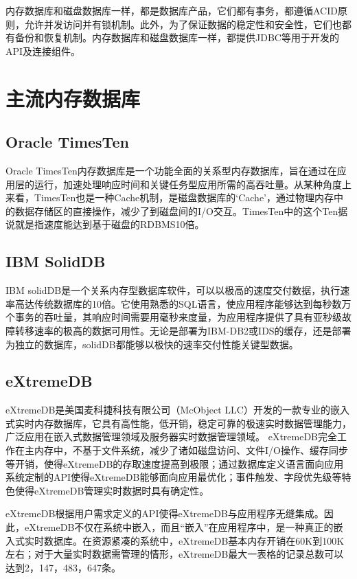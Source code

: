 \documentclass[literaturereview]{zjutreport}
\begin{document}
内存数据库和磁盘数据库一样，都是数据库产品，它们都有事务，都遵循ACID原则，允许并发访问并有锁机制。此外，为了保证数据的稳定性和安全性，它们也都有备份和恢复机制\cite{ref:6}。内存数据库和磁盘数据库一样，都提供JDBC等用于开发的API及连接组件。

\chapter{主流内存数据库}
\section{Oracle TimesTen}
Oracle TimesTen\cite{ref:7}内存数据库是一个功能全面的关系型内存数据库，旨在通过在应用层的运行，加速处理响应时间和关键任务型应用所需的高吞吐量。从某种角度上来看，TimesTen也是一种Cache机制，是磁盘数据库的‘Cache’，通过物理内存中的数据存储区的直接操作，减少了到磁盘间的I/O交互。TimesTen中的这个Ten据说就是指速度能达到基于磁盘的RDBMS10倍。

\section{IBM SolidDB}
IBM solidDB\cite{ref:8}是一个关系内存型数据库软件，可以以极高的速度交付数据，执行速率高达传统数据库的10倍。它使用熟悉的SQL语言，使应用程序能够达到每秒数万个事务的吞吐量，其响应时间需要用毫秒来度量，为应用程序提供了具有亚秒级故障转移速率的极高的数据可用性。无论是部署为IBM-DB2或IDS的缓存，还是部署为独立的数据库，solidDB都能够以极快的速率交付性能关键型数据。

\section{eXtremeDB}
eXtremeDB\cite{ref:9}是美国麦科捷科技有限公司（McObject LLC）开发的一款专业的嵌入式实时内存数据库，它具有高性能，低开销，稳定可靠的极速实时数据管理能力，广泛应用在嵌入式数据管理领域及服务器实时数据管理领域。
eXtremeDB完全工作在主内存中，不基于文件系统，减少了诸如磁盘访问、文件I/O操作、缓存同步等开销，使得eXtremeDB的存取速度提高到极限；通过数据库定义语言面向应用系统定制的API使得eXtremeDB能够面向应用最优化；事件触发、字段优先级等特色使得eXtremeDB管理实时数据时具有确定性。

eXtremeDB根据用户需求定义的API使得eXtremeDB与应用程序无缝集成。因此，eXtremeDB不仅在系统中嵌入，而且“嵌入”在应用程序中，是一种真正的嵌入式实时数据库。在资源紧凑的系统中，eXtremeDB基本内存开销在60K到100K左右；对于大量实时数据需管理的情形，eXtremeDB最大一表格的记录总数可以达到2，147，483，647条。
\end{document}
